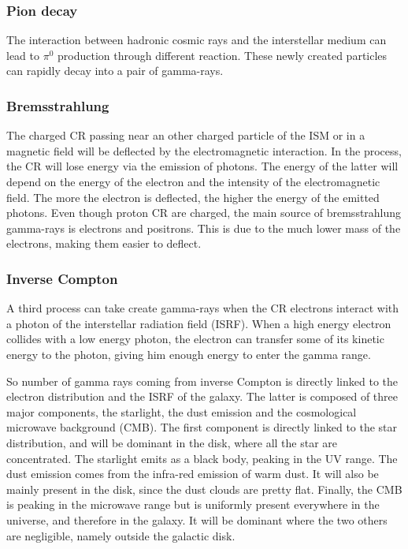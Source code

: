 \subsubsection{Pion decay}


The interaction between hadronic cosmic rays and the interstellar medium can lead to $\pi^0$ production through different reaction. These newly created  particles can rapidly decay into a pair of gamma-rays.



\subsubsection{Bremsstrahlung}


The charged CR passing near an other charged particle of the ISM or in a magnetic field will be deflected by the electromagnetic interaction. In the process, the CR will lose energy via the emission of photons. The energy of the latter will depend on the energy of the electron and the intensity of the electromagnetic field. The more the electron is deflected, the higher the energy of the emitted photons.
Even though proton CR are charged, the main source of bremsstrahlung gamma-rays is electrons and positrons. This is due to the much lower mass of the electrons, making them easier to deflect.



\subsubsection{Inverse Compton}


A third process can take create gamma-rays when the CR electrons interact with a photon of the interstellar radiation field (ISRF). When a high energy electron collides with a low energy photon, the electron can transfer some of its kinetic energy to the photon, giving him enough energy to enter the gamma range.

So number of gamma rays coming from inverse Compton is directly linked to the electron distribution and the ISRF of the galaxy. The latter is composed of three major components, the starlight, the dust emission and the cosmological microwave background (CMB). The first component is directly linked to the star distribution, and will be dominant in the disk, where all the star are concentrated. The starlight emits as a black body, peaking in the UV range. The dust emission comes from the infra-red emission of warm dust. It will also be mainly present in the disk, since the dust clouds are pretty flat. Finally, the CMB is peaking in the microwave range but is uniformly present everywhere in the universe, and therefore in the galaxy. It will be dominant where the two others are negligible, namely outside the galactic disk.


